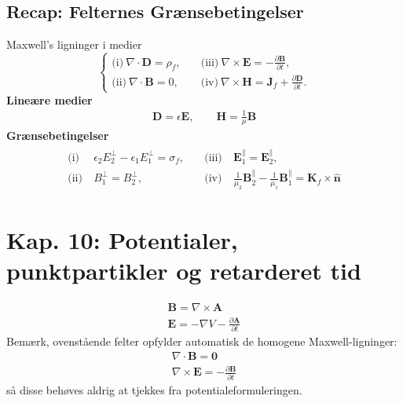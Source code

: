 \documentclass[a4paper]{article}
\begin{document}
    \subsection{Recap: Felternes Grænsebetingelser}
    Maxwell's ligninger i medier
    \[
    \begin{cases}
    \text{(i)} \ \nabla \cdot \mathbf{D} = \rho _f, \quad & \text{(iii)} \ \nabla \times \mathbf{E} = -\frac{\partial \mathbf{B}}{\partial t}, \\[5pt]
    \text{(ii)} \ \nabla \cdot \mathbf{B} = 0, \quad & \text{(iv)} \ \nabla \times \mathbf{H} = \mathbf{J}_f + \frac{\partial \mathbf{D}}{\partial t}.
    \end{cases}
    \]
    \textbf{Lineære medier}
    \begin{align*}
        \mathbf{D} = \epsilon \mathbf{E}, \qquad \mathbf{H} = \frac{1}{\mu } \mathbf{B}
    \end{align*}
    \textbf{Grænsebetingelser} \begin{align*}
        \begin{aligned}
        \text{(i)} \ & \epsilon_2 E_2^\perp - \epsilon_1 E_1^\perp = \sigma _f, \quad & \text{(iii)} \ & \mathbf{E}_1^\parallel = \mathbf{E}_2^\parallel, \\[5pt]
        \text{(ii)} \ & B_1^\perp = B_2^\perp, \quad & \text{(iv)} \ & \frac{1}{\mu_2} \mathbf{B}_2^\parallel - \frac{1}{\mu_1} \mathbf{B}_1^\parallel = \mathbf{K}_f \times \hat{\mathbf{n}}
        \end{aligned}\tag{7.73}
    \end{align*}

    
    \newpage
    \section{Kap. 10: Potentialer, punktpartikler og retarderet tid}
    \begin{gather*}
        \boxed{\mathbf{B} = \nabla \times \mathbf{A}}\\
        \boxed{\mathbf{E} = - \nabla V - \frac{\partial \mathbf{A}}{\partial t} }
    \end{gather*}
    Bemærk, ovenstående felter opfylder automatisk de homogene Maxwell-ligninger: 
    \begin{gather*}
        \nabla \cdot \mathbf{B} = \mathbf{0}\\
        \nabla \times \mathbf{E} = - \frac{\partial \mathbf{B}}{\partial t} 
    \end{gather*} 
    så disse behøves aldrig at tjekkes fra potentialeformuleringen.
\end{document}
